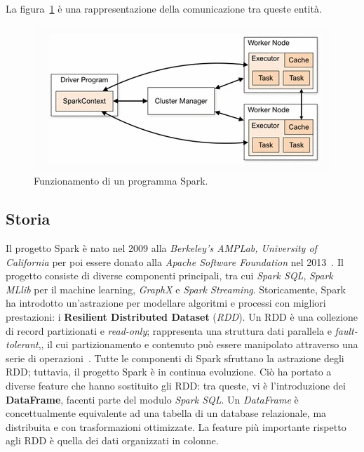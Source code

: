 La figura~\ref{fig:spark-application} è una rappresentazione della comunicazione tra queste entità.
\begin{figure}
    \includegraphics[width=\textwidth]{img/spark-application.png}
    \centering
    \caption{Funzionamento di un programma Spark.}
    \label{fig:spark-application}
\end{figure}

\subsection{Storia}\label{subsec:spark-history}

Il progetto Spark è nato nel 2009 alla \textit{Berkeley’s AMPLab, University of California} per poi essere donato alla \textit{Apache Software Foundation} nel 2013~\cite{big-data-spark}.
Il progetto consiste di diverse componenti principali, tra cui \textit{Spark SQL}, \textit{Spark MLlib} per il machine learning, \textit{GraphX} e \textit{Spark Streaming}.
Storicamente, Spark ha introdotto un'astrazione per modellare algoritmi e processi con migliori prestazioni: i \textbf{Resilient Distributed Dataset} (\textit{RDD}).
Un RDD è una collezione di record partizionati e \textit{read-only};
rappresenta una struttura dati parallela e \textit{fault-tolerant},, il cui partizionamento e contenuto può essere manipolato attraverso una serie di operazioni~\cite{big-data-spark}.
Tutte le componenti di Spark sfruttano la astrazione degli RDD;
tuttavia, il progetto Spark è in continua evoluzione.
Ciò ha portato a diverse feature che hanno sostituito gli RDD:
tra queste, vi è l'introduzione dei \textbf{DataFrame}, facenti parte del modulo \textit{Spark SQL}.
Un \textit{DataFrame} è concettualmente equivalente ad una tabella di un database relazionale, ma distribuita e con trasformazioni ottimizzate.
La feature più importante rispetto agli RDD è quella dei dati organizzati in colonne.

